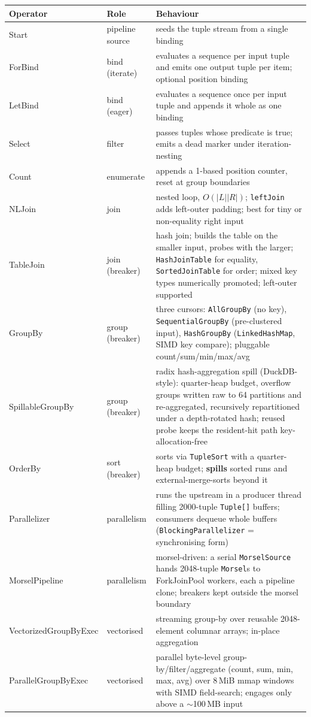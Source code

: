 \documentclass[11pt,a4paper,oneside]{report}
\theoremstyle{sirixthm}
\newcommand{\code}[1]{\texttt{#1}}
\begin{document}
{\small
\begin{xltabular}{\linewidth}{@{}>{\ttfamily\small}p{0.255\textwidth} >{\RaggedRight\arraybackslash}p{0.135\textwidth} >{\RaggedRight\arraybackslash}X@{}}
\toprule
\textnormal{\textbf{Operator}} & \textbf{Role} & \textbf{Behaviour}\\
\midrule
\endhead
Start & pipeline source & seeds the tuple stream from a single binding\\
ForBind & bind (iterate) & evaluates a sequence per input tuple and emits one output tuple per item; optional position binding\\
LetBind & bind (eager) & evaluates a sequence once per input tuple and appends it whole as one binding\\
Select & filter & passes tuples whose predicate is true; emits a dead marker under iteration-nesting\\
Count & enumerate & appends a 1-based position counter, reset at group boundaries\\
NLJoin & join & nested loop, $O(\lvert L\rvert\lvert R\rvert)$; \code{leftJoin} adds left-outer padding; best for tiny or non-equality right input\\
TableJoin & join (breaker) & hash join; builds the table on the smaller input, probes with the larger; \code{HashJoinTable} for equality, \code{SortedJoinTable} for order; mixed key types numerically promoted; left-outer supported\\
GroupBy & group (breaker) & three cursors: \code{AllGroupBy} (no key), \code{SequentialGroupBy} (pre-clustered input), \code{HashGroupBy} (\code{LinkedHashMap}, SIMD key compare); pluggable count/sum/min/max/avg\\
SpillableGroupBy & group (breaker) & radix hash-aggregation spill (DuckDB-style): quarter-heap budget, overflow groups written raw to 64 partitions and re-aggregated, recursively repartitioned under a depth-rotated hash; reused probe keeps the resident-hit path key-allocation-free\\
OrderBy & sort (breaker) & sorts via \code{TupleSort} with a quarter-heap budget; \textbf{spills} sorted runs and external-merge-sorts beyond it\\
Parallelizer & parallelism & runs the upstream in a producer thread filling 2000-tuple \code{Tuple[]} buffers; consumers dequeue whole buffers (\code{BlockingParallelizer} = synchronising form)\\
MorselPipeline & parallelism & morsel-driven: a serial \code{MorselSource} hands 2048-tuple \code{Morsel}s to ForkJoinPool workers, each a pipeline clone; breakers kept outside the morsel boundary\\
VectorizedGroupByExec & vectorised & streaming group-by over reusable 2048-element columnar arrays; in-place aggregation\\
ParallelGroupByExec & vectorised & parallel byte-level group-by/filter/aggregate (count, sum, min, max, avg) over 8\,MiB mmap windows with SIMD field-search; engages only above a $\sim$100\,MB input\\
\bottomrule
\end{xltabular}}
\end{document}
